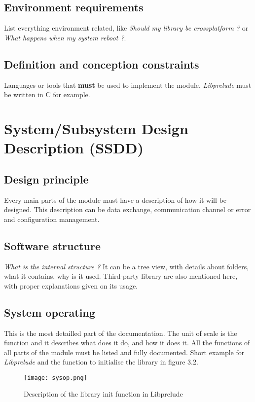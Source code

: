\documentclass{koala-en}
\begin{document}
\subsection{Environment requirements}
List everything environment related, like \emph{Should my library be crossplatform ?} or \emph{What happens when my system reboot ?}.

\subsection{Definition and conception constraints}
Languages or tools that \textbf{must} be used to implement the module. \emph{Libprelude} must be written in C for example.

\section{System/Subsystem Design Description (SSDD)}
\subsection{Design principle}
Every main parts of the module must have a description of how it will be designed. This description can be data exchange, communication channel or error and configuration management.

\subsection{Software structure}
\emph{What is the internal structure ?}
\newline
It can be a tree view, with details about folders, what it contains, why is it used. Third-party library are also mentioned here, with proper explanations given on its usage.

\subsection{System operating}
This is the most detailled part of the documentation. The unit of scale is the function and it describes what does it do, and how it does it. All the functions of all parts of the module must be listed and fully documented.
\newline
\newline
Short example for \emph{Libprelude} and the function to initialise the library in figure 3.2.

\begin{figure}[!ht]
  \center
  \texttt{[image: sysop.png]}
  \caption{Description of the library init function in Libprelude}
\end{figure}
\end{document}
